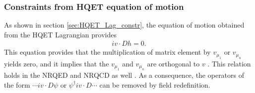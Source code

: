 \subsubsection{Constraints from HQET equation of motion}
\vspace{-0.3cm}
As shown in section \ref{sec:HQET_Lag_constr}, the equation of motion obtained from the HQET Lagrangian provides
\begin{eqnarray}\label{eqn:chap4_HQET_EOM}
i v\cdot D h=0.
\end{eqnarray}
This equation provides that the multiplication of matrix element by $v_{\mu_1}$ or $v_{\mu_n}$ yields zero, and it implies that the $v_{\mu_1}$ and $v_{\mu_n}$ are orthogonal to $v$ \cite{Mannel:1994kv}. This relation holds in the NRQED and NRQCD as well \cite{Gunawardana:2017zix}. As a consequence, the operators of the form $\cdots iv\cdot D\psi$ or $\psi^{\dagger}iv\cdot D\cdots$ can be removed by field redefinition. 
\vspace{-0.5cm}
